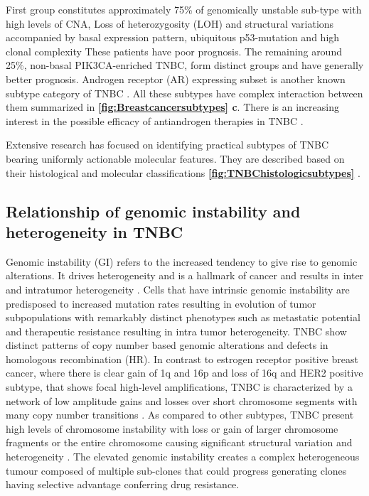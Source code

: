First group constitutes approximately 75\% of genomically unstable sub-type with high levels of \ac{CNA}, Loss of heterozygosity (LOH) and structural variations accompanied by basal expression pattern, ubiquitous p53-mutation and high clonal complexity \cite{shah2012clonal, garrido2019insights} These patients have poor prognosis. The remaining around 25\%,  non-basal PIK3CA-enriched TNBC, form distinct groups and have generally better prognosis. Androgen receptor (AR) expressing subset is another known subtype category of TNBC \cite{tang2012expression, rakha2007prognostic,mrklic2013expression}. All these subtypes have complex interaction between them summarized in \textbf{\autoref{fig:Breastcancersubtypes} c}.
There is an increasing interest in the possible efficacy of antiandrogen therapies in TNBC \cite{gerratana2018androgen,gucalp2013phase}.

 Extensive research has focused on identifying practical subtypes of TNBC bearing uniformly actionable molecular features. They are described based on their histological and molecular classifications \textbf{\autoref{fig:TNBChistologicsubtypes}} \cite{weigelt2009histological,bianchini2016triple}. 

\subsection{Relationship of genomic instability and heterogeneity in TNBC}
Genomic instability (GI) refers to the increased tendency to give rise to genomic alterations. It drives heterogeneity and is a hallmark of cancer and results in inter and intratumor heterogeneity \cite{hanahan2011hallmarks}.
 Cells that have intrinsic genomic instability are predisposed to increased mutation rates resulting in evolution of tumor subpopulations with remarkably distinct phenotypes such as metastatic potential and therapeutic resistance \cite{fidler1978tumor, burrell2013causes,januvskevivciene2019heterogeneity} resulting in intra tumor heterogeneity. 
TNBC show distinct patterns of copy number based genomic alterations and defects in homologous recombination (HR). In contrast to estrogen receptor positive breast cancer, where there is clear gain of 1q and 16p and loss of 16q and HER2 positive subtype, that shows focal high-level amplifications, TNBC is characterized by a network of low amplitude gains and losses over short chromosome segments with many copy number transitions \cite{kwei2010genomic}.
As compared to other subtypes, TNBC present high levels of chromosome instability with loss or gain of larger chromosome fragments or the entire chromosome causing significant structural variation and heterogeneity \cite{lee2016mechanisms}.
The elevated genomic instability creates a complex heterogeneous tumour composed of multiple sub-clones that could progress generating clones having selective advantage conferring drug resistance. 

